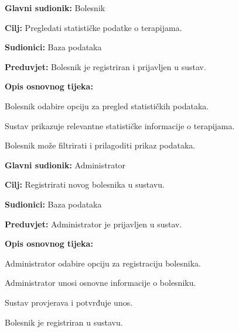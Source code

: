 \documentclass{article}
\begin{document}
\vspace{1em} %
\begin{packed_item}
\item \textbf{Glavni sudionik:} Bolesnik
\item \textbf{Cilj:} Pregledati statističke podatke o terapijama.
\item \textbf{Sudionici:} Baza podataka
\item \textbf{Preduvjet:} Bolesnik je registriran i prijavljen u sustav.
\item \textbf{Opis osnovnog tijeka:}
\begin{packed_enum}
\item Bolesnik odabire opciju za pregled statističkih podataka.
\item Sustav prikazuje relevantne statističke informacije o terapijama.
\item Bolesnik može filtrirati i prilagoditi prikaz podataka.
\end{packed_enum}
\end{packed_item}

\vspace{1em} %
\begin{packed_item}
\item \textbf{Glavni sudionik:} Administrator
\item \textbf{Cilj:} Registrirati novog bolesnika u sustavu.
\item \textbf{Sudionici:} Baza podataka
\item \textbf{Preduvjet:} Administrator je prijavljen u sustav.
\item \textbf{Opis osnovnog tijeka:}
\begin{packed_enum}
\item Administrator odabire opciju za registraciju bolesnika.
\item Administrator unosi osnovne informacije o bolesniku.
\item Sustav provjerava i potvrđuje unos.
\item Bolesnik je registriran u sustavu.
\end{packed_enum}
\end{packed_item}
\end{document}
